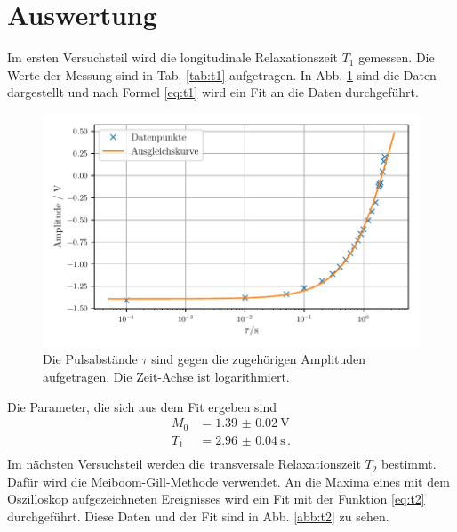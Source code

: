 \section{Auswertung}

Im ersten Versuchsteil wird die longitudinale Relaxationszeit $T_1$ gemessen. 
Die Werte der Messung sind in Tab. \ref{tab:t1} aufgetragen. 
In Abb. \ref{abb:t1} sind die Daten dargestellt und nach Formel \eqref{eq:t1} wird ein Fit an die Daten durchgeführt.



\begin{figure}
    \centering
    \includegraphics[width=\textwidth]{plots/T1.pdf}
    \caption{Die Pulsabstände $\tau$ sind gegen die zugehörigen Amplituden aufgetragen. Die Zeit-Achse ist logarithmiert.}
    \label{abb:t1}
\end{figure}

Die Parameter, die sich aus dem Fit ergeben sind 
\begin{align*}
    M_0 &= \SI{1.39(2)}{\volt} \\
    T_1 &= \SI{2.96(4)}{\second}\,. \\
\end{align*}
Im nächsten Versuchsteil werden die transversale Relaxationszeit $T_2$ bestimmt. 
Dafür wird die Meiboom-Gill-Methode verwendet. An die Maxima eines mit dem Oszilloskop aufgezeichneten Ereignisses wird ein Fit mit der Funktion \eqref{eq:t2} durchgeführt. Diese Daten und der Fit sind in Abb. \ref{abb:t2} zu sehen. 

